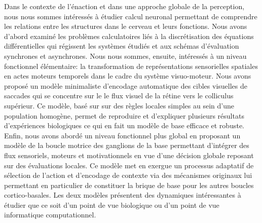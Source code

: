 
\small{Dans le contexte de l'énaction et dans une approche globale de la perception, nous nous sommes intéressés à étudier calcul neuronal permettant de comprendre les relations entre les structures dans le cerveau et leurs fonctions. Nous avons d'abord examiné les problèmes calculatoires liés à la discrétisation des équations différentielles qui régissent les systèmes étudiés et aux schémas d'évaluation synchrones et asynchrones. Nous nous sommes, ensuite, intéressés à un niveau fonctionnel élémentaire: la transformation de représentations sensorielles spatiales en actes moteurs temporels dans le cadre du système visuo-moteur. Nous avons proposé un modèle minimaliste d'encodage automatique des cibles visuelles de saccades qui se concentre sur le le flux visuel de la rétine vers le colliculus supérieur. Ce modèle, basé sur sur des règles locales simples au sein d'une population homogène, permet de reproduire et d'expliquer plusieurs résultats d'expériences biologiques ce qui en fait un modèle de base efficace et robuste. Enfin, nous avons abordé un niveau fonctionnel plus global en proposant un modèle de la boucle motrice des ganglions de la base permettant d'intégrer des flux sensoriels, moteurs et motivationnels en vue d'une décision globale reposant sur des évaluations locales. Ce modèle met en exergue un processus adaptatif de sélection de l'action et d'encodage de contexte via des mécanismes originaux lui permettant en particulier de constituer la brique de base pour les autres boucles cortico-basales. Les deux modèles présentent des dynamiques intéressantes à étudier que ce soit d'un point de vue biologique ou d'un point de vue informatique computationnel.}

